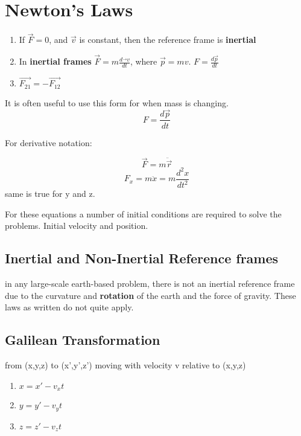 \section{Newton's Laws}



\begin{enumerate}
	\item If $\vec F=0$, and $\vec v$ is constant, then the reference frame is \textbf{inertial}
	
	\item In \textbf{inertial frames}
		$\vec{F}=m\frac{d\vec{}v}{dt}$, where $\vec{p}=mv$. $F=\frac{d\vec{p}}{dt}$
	\item $\vec{F_{21}}=-\vec{F_{12}}$
\end{enumerate}

It is often useful to use this form for when mass is changing.
\begin{equation}
	\label{}
	F=\frac{d\vec{p}}{dt}	
\end{equation}



For derivative notation:


\begin{equation}
	\label{}
	\vec F=m\ddot{\vec{r}}
\end{equation}
\begin{equation}
	\label{}
	F_{x}=m\ddot{x}=m\frac{d^{2}x}{dt^{2}}	
\end{equation}
same is true for y and z.


For these equations a number of initial conditions are required to solve the problems. Initial velocity and position.

\subsection{Inertial and Non-Inertial Reference frames}
in any large-scale earth-based problem, there is not an inertial reference frame due to the curvature and \textbf{rotation} of the earth and the force of gravity. These laws as written do not quite apply.

\subsection{Galilean Transformation}
from (x,y,z) to (x',y',z') moving with velocity v relative to (x,y,z)
\begin{enumerate}
	\item $x=x'-v_{x}t$
	\item $y=y'-v_{y}t$
	\item $z=z'-v_{z}t$
\end{enumerate}



